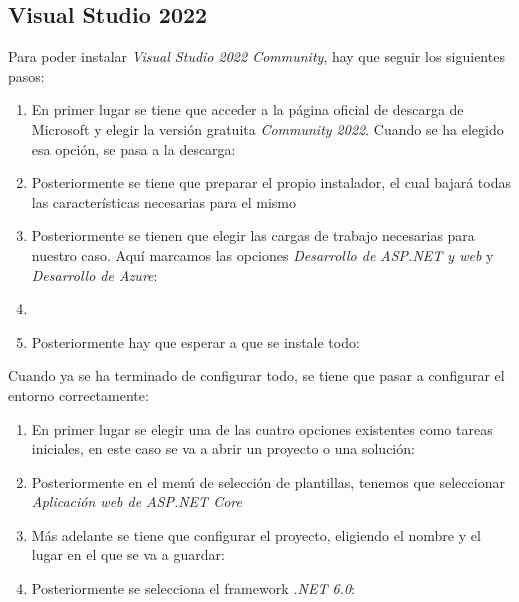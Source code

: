\begin{enumerate}
\end{enumerate}
\subsection{Visual Studio 2022}
Para poder instalar  \textit{Visual Studio 2022 Community}, hay que seguir los siguientes pasos:
\begin{enumerate}
    \item En primer lugar se tiene que acceder a la página oficial de descarga de Microsoft y elegir la versión gratuita \textit{Community 2022}. Cuando se ha elegido esa opción, se pasa a la descarga:
    \item Posteriormente se tiene que preparar el propio instalador, el cual bajará todas las características necesarias para el mismo
    \item Posteriormente se tienen que elegir las cargas de trabajo necesarias para nuestro caso. Aquí marcamos las opciones \textit{Desarrollo de ASP.NET y web} y \textit{Desarrollo de Azure}:
    \item {}
    \item Posteriormente hay que esperar a que se instale todo:
\end{enumerate}
Cuando ya se ha terminado de configurar todo, se tiene que pasar a configurar el entorno correctamente:
\begin{enumerate}
    \item En primer lugar se elegir una de las cuatro opciones existentes como tareas iniciales, en este caso se va a abrir un proyecto o una solución: 
    \item Posteriormente en el menú de selección de plantillas, tenemos que seleccionar  \textit{Aplicación web de ASP.NET Core}
    \item Más adelante se tiene que configurar el proyecto, eligiendo el nombre y el lugar en el que se va a guardar:
    \item Posteriormente se selecciona el framework \textit{.NET 6.0}: 
    
\end{enumerate}
